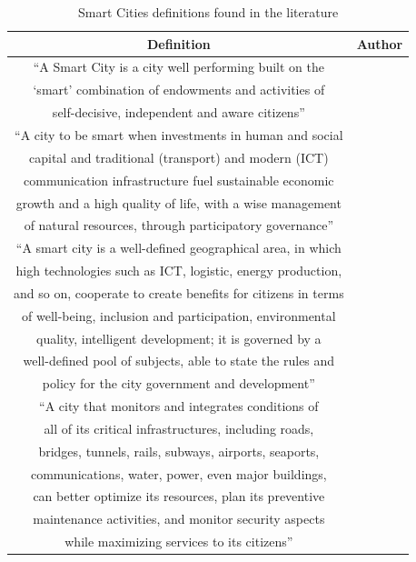 \begin{table}
\centering
\caption{Smart Cities definitions found in the literature}
\label{tab:definicoes}
\smallskip
\begin{tabular}{c|c}
\hline

Definition 
& Author \\\hline

“A Smart City is a city well performing built on the\\
‘smart’ combination of endowments and activities of\\ 
self-decisive, independent and aware citizens” &  \cite{giffinger2007smart} \\\hline

“A city to be smart when investments in human and social\\
capital and traditional (transport) and modern (ICT)\\
communication infrastructure fuel sustainable economic\\ 
growth and a high quality of life, with a wise management\\
of natural resources, through participatory governance”
& \cite{caragliu2011smart}  \\\hline

“A smart city is a well-defined geographical area, in which\\
high technologies such as ICT, logistic, energy production,\\ 
and so on, cooperate to create benefits for citizens in terms\\
of well-being, inclusion and participation, environmental\\
quality, intelligent development; it is governed by a\\ 
well-defined pool of subjects, able to state the rules and\\ 
policy for the city government and development” 
& \cite{dameri2013searching}  \\\hline

“A city that monitors and integrates conditions of \\
all of its critical infrastructures, including roads, \\ 
bridges, tunnels, rails, subways, airports, seaports, \\ 
communications, water, power, even major buildings, \\
can better optimize its resources, plan its preventive \\
maintenance activities, and monitor security aspects \\
while maximizing services to its citizens”
& \cite{hall2000creative} \\\hline


\end{tabular}
\end{table}
